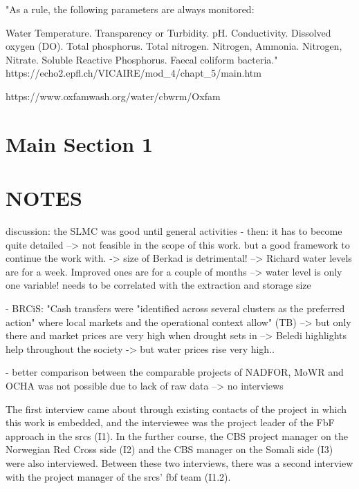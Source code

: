 "As a rule, the following parameters are always monitored:

Water Temperature.
Transparency or Turbidity.
pH.
Conductivity.
Dissolved oxygen (DO).
Total phosphorus.
Total nitrogen.
Nitrogen, Ammonia.
Nitrogen, Nitrate.
Soluble Reactive Phosphorus.
Faecal coliform bacteria." https://echo2.epfl.ch/VICAIRE/mod_4/chapt_5/main.htm

https://www.oxfamwash.org/water/cbwrm/Oxfam%

\section{Main Section 1}


\section{NOTES}

discussion: the SLMC was good until general activities - then: it has to become quite detailed --> not feasible in the scope of this work. but a good framework to continue the work with.
-> size of Berkad is detrimental! --> Richard water levels are for a week. Improved ones are for a couple of months --> water level is only one variable! needs to be correlated with the extraction and storage size

- BRCiS: "Cash transfers were "identified across several clusters as the preferred action" where local markets and the operational context allow" (TB) --> but only there and market prices are very high when drought sets in
--> Beledi highlights help throughout the society -> but water prices rise very high.. 

- better comparison between the comparable projects of NADFOR, MoWR and OCHA was not possible due to lack of raw data --> no interviews



The first interview came about through existing contacts of the project in which this work is embedded, and the interviewee was the project leader of the FbF approach in the \acrshort{srcs} (I1). In the further course, the CBS project manager on the Norwegian Red Cross side (I2) and the CBS manager on the Somali side (I3) were also interviewed. Between these two interviews, there was a second interview with the project manager of the \acrshort{srcs}' \acrshort{fbf} team (I1.2).